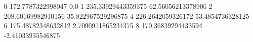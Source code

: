 0 172.7787322998047 0.0
1 235.33929443359375 62.56056213378906
2 208.60169982910156 35.822967529296875
4 226.2642059326172 53.4854736328125
6 175.48782348632812 2.7090911865234375
8 170.36839294433594 -2.41033935546875

